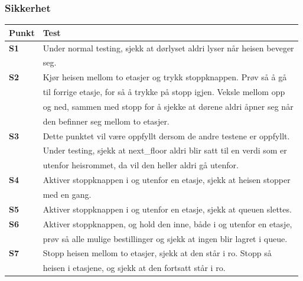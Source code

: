 \documentclass{article}
\begin{document}
\subsubsection{Sikkerhet}
\begin{table}[htbp]
\begin{tabularx}{\textwidth}{ l l }  %
\toprule
Punkt & Test \\
        \midrule
        \textbf{S1} & Under normal testing, sjekk at dørlyset aldri lyser når heisen beveger \\
        & seg. \\
        \midrule
        \textbf{S2} & Kjør heisen mellom to etasjer og trykk stoppknappen. Prøv så å gå \\
        & til forrige etasje, for så å trykke på stopp igjen. Veksle mellom opp \\
        & og ned, sammen med stopp for å sjekke at dørene aldri åpner seg når \\
        & den befinner seg mellom to etasjer.\\
        \midrule
        \textbf{S3} & Dette punktet vil være oppfyllt dersom de andre testene er oppfyllt.\\
        & Under testing, sjekk at next\_floor aldri blir satt til en verdi som er\\
        & utenfor heisrommet, da vil den heller aldri gå utenfor. \\
        \midrule
        \textbf{S4} & Aktiver stoppknappen i og utenfor en etasje, sjekk at heisen stopper\\
        & med en gang.\\
        \midrule
        \textbf{S5} & Aktiver stoppknappen i og utenfor en etasje, sjekk at queuen slettes.\\
        \midrule
        \textbf{S6} & Aktiver stoppknappen, og hold den inne, både i og utenfor en etasje,\\
        & prøv så alle mulige bestillinger og sjekk at ingen blir lagret i queue. \\
        \midrule
        \textbf{S7} & Stopp heisen mellom to etasjer, sjekk at den står i ro. Stopp så \\
        & heisen i etasjene, og sjekk at den fortsatt står i ro. \\
\bottomrule
\end{tabularx}
\label{table:nonlin}
\end{table}
\end{document}
